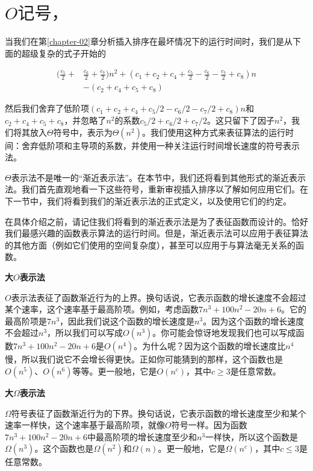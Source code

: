 \documentclass[lang=cn,newtx,10pt,scheme=chinese]{elegantbook}
\begin{document}
\section{\texorpdfstring{$O\text{记号，}$}\texorpdfstring{$\Omega\text{记号和}$}\texorpdfstring{$\Theta\text{记号}$}.}\label{section-3.1}

当我们在第\ref{chapter-02}章分析插入排序在最坏情况下的运行时间时，我们是从下面的超级复杂的式子开始的

\begin{equation*}
\begin{aligned}
(\frac{c_5}{2}+ & \frac{c_6}{2}+\frac{c_7}{2}) n^2+(c_1+c_2+c_4+\frac{c_5}{2}-\frac{c_6}{2}-\frac{c_7}{2}+c_8) n \\
& -(c_2+c_4+c_5+c_8)
\end{aligned}
\end{equation*}

然后我们舍弃了低阶项$(c_1+c_2+c_4+c_5 / 2-c_6 / 2-c_7 / 2+c_8) n$和$c_2+c_4+c_5+c_8$，并忽略了$n^2$的系数$c_5 / 2+c_6 / 2+c_7 / 2$。这只留下了因子$n^2$，我们将其放入$\Theta$符号中，表示为$\Theta(n^2)$。我们使用这种方式来表征算法的运行时间：舍弃低阶项和主导项的系数，并使用一种关注运行时间增长速度的符号表示法。

$\Theta$表示法不是唯一的``渐近表示法''。在本节中，我们还将看到其他形式的渐近表示法。我们首先直观地看一下这些符号，重新审视插入排序以了解如何应用它们。在下一节中，我们将看到我们的渐近表示法的正式定义，以及使用它们的约定。

在具体介绍之前，请记住我们将看到的渐近表示法是为了表征函数而设计的。恰好我们最感兴趣的函数表示算法的运行时间。但是，渐近表示法可以应用于表征算法的其他方面（例如它们使用的空间复杂度），甚至可以应用于与算法毫无关系的函数。

\textbf{大$O$表示法}

$O$表示法表征了函数渐近行为的上界。换句话说，它表示函数的增长速度不会超过某个速率，这个速率基于最高阶项。例如，考虑函数$7 n^3+100 n^2-20 n+6$。它的最高阶项是$7n^3$，因此我们说这个函数的增长速度是$n^3$。因为这个函数的增长速度不会超过$n^3$，所以我们可以写成$O(n^3)$。你可能会惊讶地发现我们也可以写成函数$7 n^3+100 n^2-20 n+6$是$O(n^4)$。为什么呢？因为这个函数的增长速度比$n^4$慢，所以我们说它不会增长得更快。正如你可能猜到的那样，这个函数也是$O(n^5)$、$O(n^6)$等等。更一般地，它是$O(n^c)$，其中$c \ge 3$是任意常数。

\textbf{大$\Omega$表示法}

$\Omega$符号表征了函数渐近行为的下界。换句话说，它表示函数的增长速度至少和某个速率一样快，这个速率基于最高阶项，就像$O$符号一样。因为函数$7n^3+100n^2-20n+6$中最高阶项的增长速度至少和$n^3$一样快，所以这个函数是$\Omega(n^3)$。这个函数也是$\Omega(n^2)$和$\Omega(n)$。更一般地，它是$\Omega(n^c)$，其中$c \leq 3$是任意常数。
\end{document}
